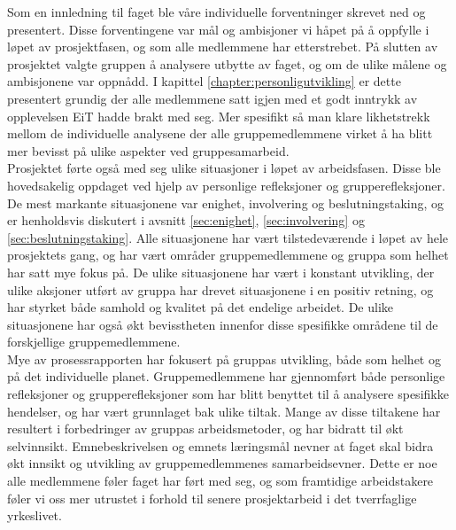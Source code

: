 
Som en innledning til faget ble våre individuelle forventninger skrevet ned og presentert. Disse forventingene var mål og ambisjoner vi håpet på å oppfylle i løpet av prosjektfasen, og som alle medlemmene har etterstrebet. På slutten av prosjektet valgte gruppen å analysere utbytte av faget, og om de ulike målene og ambisjonene var oppnådd. I kapittel \ref{chapter:personligutvikling} er dette presentert grundig der alle medlemmene satt igjen med et godt inntrykk av opplevelsen EiT hadde brakt med seg. Mer spesifikt så man klare likhetstrekk mellom de individuelle analysene der alle gruppemedlemmene virket å ha blitt mer bevisst på ulike aspekter ved gruppesamarbeid.\\

Prosjektet førte også med seg ulike situasjoner i løpet av arbeidsfasen. Disse ble hovedsakelig oppdaget ved hjelp av personlige refleksjoner og grupperefleksjoner. De mest markante situasjonene var enighet, involvering og beslutningstaking, og er henholdsvis diskutert i avsnitt \ref{sec:enighet},  \ref{sec:involvering} og  \ref{sec:beslutningstaking}. Alle situasjonene har vært tilstedeværende i løpet av hele prosjektets gang, og har vært områder gruppemedlemmene og gruppa som helhet har satt mye fokus på. De ulike situasjonene har vært i konstant utvikling, der ulike aksjoner utført av gruppa har drevet situasjonene i en positiv retning, og har styrket både samhold og kvalitet på det endelige arbeidet. De ulike situasjonene har også økt bevisstheten innenfor disse spesifikke områdene til de forskjellige gruppemedlemmene.\\

Mye av prosessrapporten har fokusert på gruppas utvikling, både som helhet og på det individuelle planet. Gruppemedlemmene har gjennomført både personlige refleksjoner og grupperefleksjoner som har blitt benyttet til å analysere spesifikke hendelser, og har vært grunnlaget bak ulike tiltak. Mange av disse tiltakene har resultert i forbedringer av gruppas arbeidsmetoder, og har bidratt til økt selvinnsikt. Emnebeskrivelsen og emnets læringsmål nevner at faget skal bidra økt innsikt og utvikling av gruppemedlemmenes samarbeidsevner. Dette er noe alle medlemmene føler faget har ført med seg, og som framtidige arbeidstakere føler vi oss mer utrustet i forhold til senere prosjektarbeid i det tverrfaglige yrkeslivet.
